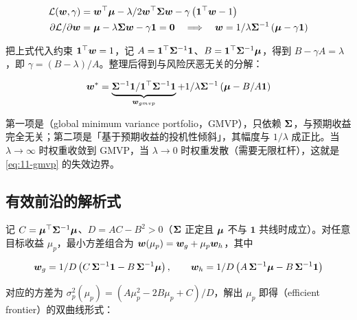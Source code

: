 \begin{align}\label{eq:11-lagr}
  \mathcal{L}(\bm{w},\gamma) &= \bm{w}^{\top}\bm{\mu} - \lambda/2\bm{w}^{\top}\bm{\Sigma}\bm{w} - \gamma\left(\mathbf{1}^{\top}\bm{w} - 1\right) \\
  \partial \mathcal{L}/\partial \bm{w} &= \bm{\mu} - \lambda \bm{\Sigma} \bm{w} - \gamma \mathbf{1} = \mathbf{0}
  \quad \Longrightarrow \quad
  \bm{w} = 1/\lambda\bm{\Sigma}^{-1}\left(\bm{\mu} - \gamma \mathbf{1}\right)
\end{align}

把上式代入约束 $\mathbf{1}^{\top}\bm{w} = 1$，记 $A = \mathbf{1}^{\top}\bm{\Sigma}^{-1}\mathbf{1}$、$B = \mathbf{1}^{\top}\bm{\Sigma}^{-1}\bm{\mu}$，得到 $B - \gamma A = \lambda$，即 $\gamma = (B-\lambda)/A$。整理后得到与风险厌恶无关的分解：

\begin{equation}\label{eq:11-gmvp}
  \bm{w}^{*} = \underbrace{\bm{\Sigma}^{-1}\mathbf{1}/\mathbf{1}^{\top}\bm{\Sigma}^{-1}\mathbf{1}}_{\bm{w}_{gmvp}}
  + 1/\lambda\bm{\Sigma}^{-1}\left(\bm{\mu} - B/A\mathbf{1}\right)
\end{equation}

第一项是（global minimum variance portfolio，GMVP），只依赖 $\bm{\Sigma}$，与预期收益完全无关；第二项是「基于预期收益的投机性倾斜」，其幅度与 $1/\lambda$ 成正比。当 $\lambda \to \infty$ 时权重收敛到 GMVP，当 $\lambda \to 0$ 时权重发散（需要无限杠杆），这就是\cref{eq:11-gmvp} 的失效边界。

\subsection{有效前沿的解析式}

记 $C = \bm{\mu}^{\top}\bm{\Sigma}^{-1}\bm{\mu}$、$D = AC - B^{2} > 0$（$\bm{\Sigma}$ 正定且 $\bm{\mu}$ 不与 $\mathbf{1}$ 共线时成立）。对任意目标收益 $\mu_p$，最小方差组合为 $\bm{w}(\mu_p) = \bm{w}_g + \mu_p \bm{w}_h$，其中

\begin{equation}\label{eq:11-twofund-weights}
  \bm{w}_g = 1/D\left(C\,\bm{\Sigma}^{-1}\mathbf{1} - B\,\bm{\Sigma}^{-1}\bm{\mu}\right), \qquad
  \bm{w}_h = 1/D\left(A\,\bm{\Sigma}^{-1}\bm{\mu} - B\,\bm{\Sigma}^{-1}\mathbf{1}\right)
\end{equation}

对应的方差为 $\sigma_p^{2}(\mu_p) = \left(A\mu_p^{2} - 2B\mu_p + C\right)/D$，解出 $\mu_p$ 即得（efficient frontier）的双曲线形式：

